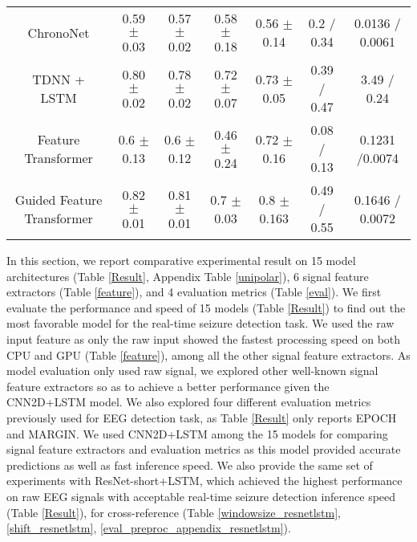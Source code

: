 \documentclass[pmlr,twocolumn,10pt]{jmlr}
\begin{document}
\begin{table*}[ht!]
\begin{tabular}{c|cccccc}
ChronoNet & 0.59 $\pm$ 0.03 & 0.57 $\pm$ 0.02 & 0.58 $\pm$ 0.18 & 0.56 $\pm$ 0.14 & 0.2 / 0.34 & 0.0136 / 0.0061   \\
		TDNN + LSTM & 0.80 $\pm$ 0.02 & 0.78 $\pm$ 0.02 & 0.72 $\pm$ 0.07 & 0.73 $\pm$ 0.05 & 0.39 / 0.47 & 3.49 / 0.24    \\
\midrule
		Feature Transformer & 0.6 $\pm$ 0.13 & 0.6 $\pm$ 0.12 & 0.46 $\pm$ 0.24 & 0.72 $\pm$ 0.16 &  0.08 / 0.13 & 0.1231 /0.0074 \\
Guided Feature Transformer  & 0.82 $\pm$ 0.01 & 0.81 $\pm$ 0.01 & 0.7 $\pm$ 0.03 & 0.8 $\pm$ 0.163 & 0.49 / 0.55 & 0.1646 / 0.0072 \\
\bottomrule
	\end{tabular}
\end{table*}

%
 
In this section, we report comparative experimental result on 15 model architectures (Table \ref{Result}, Appendix Table \ref{unipolar}), 6 signal feature extractors (Table \ref{feature}), and 4 evaluation metrics (Table \ref{eval}). We first evaluate the performance and speed of 15 models (Table \ref{Result}) to find out the most favorable model for the real-time seizure detection task. We used the raw input feature as only the raw input showed the fastest processing speed on both CPU and GPU (Table \ref{feature}), among all the other signal feature extractors. As model evaluation only used raw signal, we explored other well-known signal feature extractors so as to achieve a better performance given the CNN2D+LSTM model. We also explored four different evaluation metrics previously used for EEG detection task, as Table \ref{Result} only reports EPOCH and MARGIN. We used CNN2D+LSTM among the 15 models for comparing signal feature extractors and evaluation metrics as this model provided accurate predictions as well as fast inference speed. We also provide the same set of experiments with ResNet-short+LSTM, which achieved the highest performance on raw EEG signals with acceptable real-time seizure detection inference speed (Table \ref{Result}), for cross-reference (Table \ref{windowsize_resnetlstm}, \ref{shift_resnetlstm}, \ref{eval_preproc_appendix_resnetlstm}).
\end{document}
